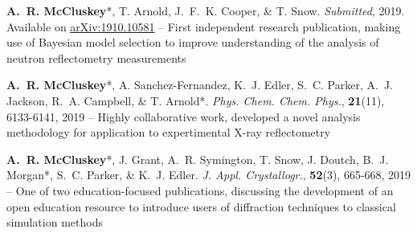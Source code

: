 \begin{cventriesy}
  \cventryy
    {
      \begin{cvitemsy}
        \item {\textbf{A.~R. McCluskey}*, T. Arnold, J.~F.~K. Cooper, \& T. Snow. \emph{Submitted}, 2019. Available on \href{https://arxiv.org/abs/1910.10581}{arXiv:1910.10581} -- First independent research publication, making use of Bayesian model selection to improve understanding of the analysis of neutron reflectometry measurements}
    \vspace{1mm}
        \item {\textbf{A.~R. McCluskey}*, A. Sanchez-Fernandez, K.~J. Edler, S.~C. Parker, A.~J. Jackson, R.~A. Campbell, \& T. Arnold*. \emph{Phys. Chem. Chem. Phys.}, \textbf{21}(11), 6133-6141, 2019 -- Highly collaborative work, developed a novel analysis methodology for application to expertimental X-ray reflectometry}
    \vspace{1mm}
        \item {\textbf{A.~R. McCluskey}*, J. Grant, A.~R. Symington, T. Snow, J. Doutch, B.~J. Morgan*, S.~C. Parker, \& K.~J. Edler. \emph{J. Appl. Crystallogr.}, \textbf{52}(3), 665-668, 2019 -- One of two education-focused publications, discussing the development of an open education resource to introduce users of diffraction techniques to classical simulation methods} 
      \end{cvitemsy}
    }
\end{cventriesy}